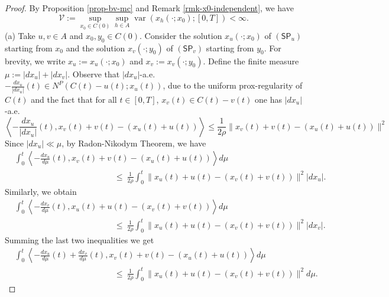\documentclass[preprint,12pt]{elsarticle}
\theoremstyle{plain}
\theoremstyle{definition}
\theoremstyle{remark}
\begin{document}
\begin{proof}
By Proposition \ref{prop-bv-mc} and Remark \ref{rmk-x0-independent}, we have $$
\displaystyle\mathscr{V} := \sup_{x_0\in C(0)}\sup_{h\in A}\operatorname{var}(x_h(\cdot;x_0);[0,T])<\infty.
$$
(a) Take $u,v\in A$ and $x_0,y_0\in C(0)$. Consider the solution $x_u(\cdot;x_0)$ of $(\mathsf{SP}_{u})$ starting from $x_0$ and the solution $x_v(\cdot;y_0)$ of  $(\mathsf{SP}_{v})$ starting from $y_0$. For brevity, we write $x_u := x_u(\cdot;x_0)$ and $x_v := x_v(\cdot;y_0)$. Define the finite measure $\mu := |dx_u| + |dx_v|$. Observe that $|dx_u|$-a.e. $-\frac{dx_u}{|dx_u|}(t)\in N^P(C(t)-u(t);x_u(t))$, due to the uniform prox-regularity of $C(t)$ and the fact that for all $t\in [0,T]$, $x_v(t) \in C(t)-v(t)$ one has $|dx_u|$-a.e.
        \begin{equation*}
				\left\langle -\frac{dx_u}{|dx_u|}(t),x_v(t)+v(t)-( x_u(t) + u(t))\right\rangle 
				\leq \frac{1}{2\rho}\|x_v(t)+v(t)-( x_u(t) + u(t))\|^2
		\end{equation*}
Since $|dx_u|\ll \mu$, by Radon-Nikodym Theorem, we have 
    \begin{equation*}
			\begin{aligned}
				&\int_{0}^t \left\langle -\frac{dx_u}{d\mu}(t),x_v(t)+v(t) - (x_u(t) + u(t)) \right\rangle 
				d\mu \\
				&\quad \quad\quad \quad\quad \quad\quad \quad\quad \quad\quad \quad \leq  \ \frac{1}{2\rho}\int_{0}^t\|x_u(t)+u(t) - (x_v(t) + v(t))\|^2  |dx_u|.
			\end{aligned}
		\end{equation*}
        Similarly, we obtain
        \begin{equation*}
			\begin{aligned}
				&\int_{0}^t \left\langle -\frac{dx_v}{d\mu}(t),x_u(t)+u(t) - (x_v(t) + v(t)) \right\rangle 
				d\mu \\
				&\quad \quad\quad \quad\quad \quad\quad \quad\quad \quad\quad \quad \leq  \ \frac{1}{2\rho}\int_{0}^t\|x_u(t)+u(t) - (x_v(t) + v(t))\|^2  |dx_v|.
			\end{aligned}
		\end{equation*}
        Summing the last two inequalities we get
\begin{equation*}
			\begin{aligned}
				&\int_{0}^t \left\langle -\frac{dx_u}{d\mu}(t)+\frac{dx_v}{d\mu}(t),x_v(t)+v(t) - (x_u(t) + u(t)) \right\rangle 
				d\mu \\
				&\quad \quad\quad \quad\quad \quad\quad \quad\quad \quad\quad \quad \leq  \ \frac{1}{2\rho}\int_{0}^t\|x_u(t)+u(t) - (x_v(t) + v(t))\|^2  d\mu.

\end{aligned}
\end{equation*}
\end{proof}
\end{document}
